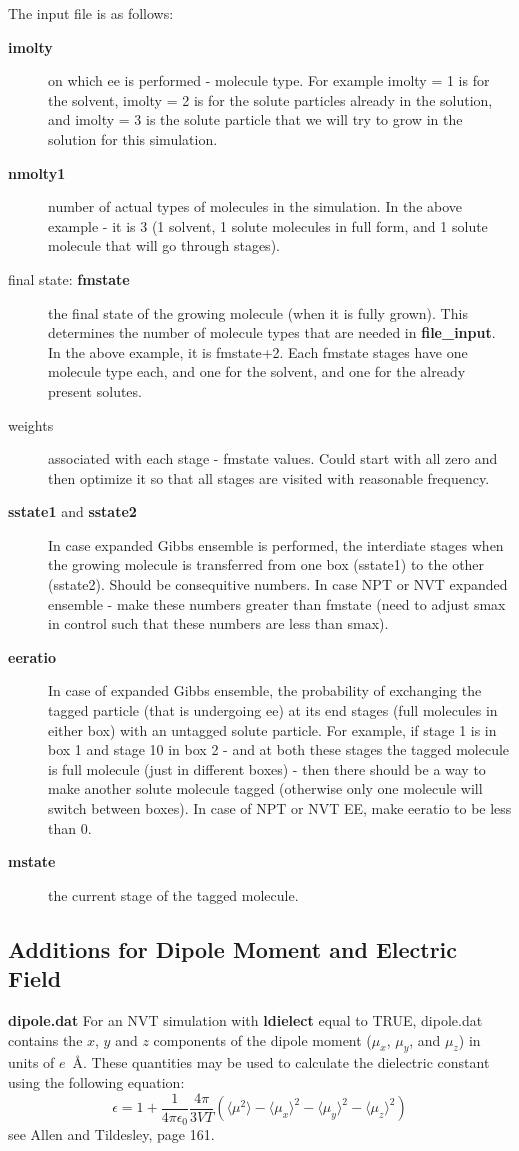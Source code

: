\documentclass[12pt,letterpaper]{article}
\begin{document}
The input file is as follows:
\begin{description}
\item[{\bf imolty}] on which ee is performed - molecule
  type. For example imolty = 1 is for the solvent, imolty =
  2 is for the solute particles already in the solution, and
  imolty = 3 is the solute particle that we will try to grow
  in the solution for this simulation.
\item[{\bf nmolty1}] number of actual types of molecules in
  the simulation. In the above example - it is 3 (1 solvent,
  1 solute molecules in full form, and 1 solute molecule
  that will go through stages).
\item[final state: {\bf fmstate}] the final state of the
  growing molecule (when it is fully grown). This determines
  the number of molecule types that are needed in {\bf
    file\_input}. In the above example, it is fmstate+2.
  Each fmstate stages have one molecule type each, and one
  for the solvent, and one for the already present solutes.
\item[weights] associated with each stage - fmstate values.
  Could start with all zero and then optimize it so that all
  stages are visited with reasonable frequency.
\item[{\bf sstate1} and {\bf sstate2}] In case expanded
  Gibbs ensemble is performed, the interdiate stages when
  the growing molecule is transferred from one box (sstate1)
  to the other (sstate2). Should be consequitive numbers. In
  case NPT or NVT expanded ensemble - make these numbers
  greater than fmstate (need to adjust smax in control such
  that these numbers are less than smax).
\item[{\bf eeratio}] In case of expanded Gibbs ensemble, the
  probability of exchanging the tagged particle (that is
  undergoing ee) at its end stages (full molecules in either
  box) with an untagged solute particle. For example, if
  stage 1 is in box 1 and stage 10 in box 2 - and at both
  these stages the tagged molecule is full molecule (just in
  different boxes) - then there should be a way to make
  another solute molecule tagged (otherwise only one
  molecule will switch between boxes). In case of NPT or NVT
  EE, make eeratio to be less than 0.
\item[{\bf mstate}] the current stage of the tagged
  molecule.
\end{description}

\subsection{Additions for Dipole Moment and Electric Field}
\noindent \textbf{dipole.dat} For an NVT simulation with
\textbf{ldielect} equal to TRUE, dipole.dat contains the
$x$, $y$ and $z$ components of the dipole moment ($\mu_x$,
$\mu_y$, and $\mu_z$) in units of $e$~\AA. These quantities
may be used to calculate the dielectric constant using the
following equation:
\begin{equation}
\epsilon = 1 + \frac{1}{4 \pi \epsilon_0} \frac{4 \pi}{3 V T} \left ( \langle \mu^2 \rangle -
 \langle \mu_x \rangle^2  - \langle \mu_y \rangle^2 - \langle \mu_z \rangle^2 \right )
\end{equation}
see Allen and Tildesley, page 161.
\end{document}
